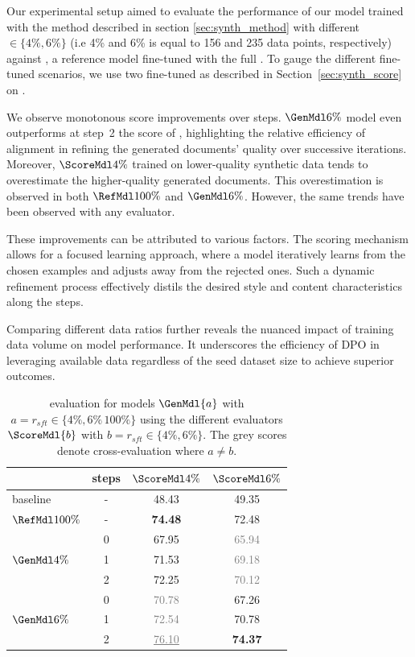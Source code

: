 Our experimental setup aimed to evaluate the performance of our model trained with the method described in section \ref{sec:synth_method} with different \rsft$\in\{4\%,6\%\}$ (i.e 4\% and 6\% is equal to 156 and 235 data points, respectively) against \mref, a reference model fine-tuned with the full \dtr. To gauge the different fine-tuned scenarios, we use two \me fine-tuned as described in Section~\ref{sec:synth_score} on \dte.  

 We observe monotonous score improvements over steps. $\GenMdl{6\%}$ model even outperforms at step~2 the score of \mref, highlighting the relative efficiency of alignment in refining the generated documents' quality over successive iterations.
 Moreover, $\ScoreMdl{4\%}$ trained on lower-quality synthetic data tends to overestimate the higher-quality generated documents. This overestimation is observed in both $\RefMdl{100\%}$ and $\GenMdl{6\%}$. However, the same trends have been observed with any evaluator.

These improvements can be attributed to various factors. The scoring mechanism allows for a focused learning approach, where a model iteratively learns from the chosen examples and adjusts away from the rejected ones. Such a dynamic refinement process effectively distils the desired style and content characteristics along the steps.

Comparing different data ratios further reveals the nuanced impact of training data volume on model performance. It underscores the efficiency of DPO in leveraging available data regardless of the seed dataset size to achieve superior outcomes. 

\begin{table}[ht]
\centering
\begin{tabular}{@{}lccc@{}}
\midrule
&\textbf{steps}&$\ScoreMdl{4\%}$ & $\ScoreMdl{6\%}$ \\ \midrule
baseline&-& 48.43 & 49.35 \\ \midrule
$\RefMdl{100\%}$&-& \textbf{74.48} &72.48 \\ \midrule
 &0&67.95&\textcolor{gray}{65.94}\\
$\GenMdl{4\%}$ &1&71.53&\textcolor{gray}{69.18}\\ 
&2& 72.25 &\textcolor{gray}{70.12}\\ \midrule 
&0&\textcolor{gray}{70.78}& 67.26 \\
$\GenMdl{6\%}$ &1&\textcolor{gray}{72.54}&70.78 \\ 
&2&\textcolor{gray}{\underline{76.10}}&\textbf{74.37} \\ \bottomrule
\end{tabular}
\caption{\score evaluation for models $\GenMdl{a}$ with ${a=r_{sft}\in\{4\%,6\%\,100\%\}}$ using the different evaluators $\ScoreMdl{b}$ with ${b=r_{sft}\in\{4\%,6\%\}}$. The grey scores denote cross-evaluation where $a \neq b$.}
\label{tab:synth_model_semscore}
\end{table}

